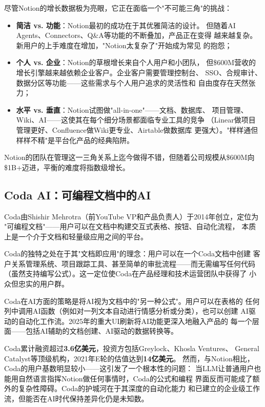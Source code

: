 \begin{warnbox}
尽管Notion的增长数据极为亮眼，它正在面临一个"不可能三角"的挑战：
\begin{itemize}
  \item \textbf{简洁 vs. 功能}：Notion最初的成功在于其优雅简洁的设计。
    但随着AI Agents、Connectors、Q\&A等功能的不断叠加，产品正在变得
    越来越复杂。新用户的上手难度在增加，"Notion太复杂了"开始成为常见
    的抱怨；
  \item \textbf{个人 vs. 企业}：Notion的草根增长来自个人用户和小团队，
    但\$600M营收的增长引擎越来越依赖企业客户。企业客户需要管理控制台、
    SSO、合规审计、数据分区等功能——这些需求与个人用户追求的灵活性和
    自由度存在天然张力；
  \item \textbf{水平 vs. 垂直}：Notion试图做"all-in-one"——文档、数据库、
    项目管理、Wiki、AI——这使其在每个细分场景都面临专业工具的竞争
    （Linear做项目管理更好、Confluence做Wiki更专业、Airtable做数据库
    更强大）。"样样通但样样不精"是平台化产品的经典陷阱。
\end{itemize}
Notion的团队在管理这一三角关系上迄今做得不错，但随着公司规模从\$600M向
\$1B+迈进，平衡的难度将指数级增长。
\end{warnbox}

\subsection{Coda AI：可编程文档中的AI}
\label{subsec:coda-ai}

Coda由Shishir Mehrotra（前YouTube VP和产品负责人）于2014年创立，定位为
"可编程文档"——用户可以在文档中构建交互式表格、按钮、自动化流程，
本质上是一个介于文档和轻量级应用之间的平台。

Coda的独特之处在于其"文档即应用"的理念：用户可以在一个Coda文档中创建
客户关系管理系统、项目跟踪工具、甚至简单的审批流程——而无需编写任何代码
（虽然支持编写公式）。这一定位使Coda在产品经理和技术运营团队中获得了
小众但忠实的用户群。

Coda在AI方面的策略是将AI视为文档中的"另一种公式"。用户可以在表格的
任何列中调用AI函数（例如对一列文本自动进行情感分析或分类），也可以创建
AI驱动的自动化工作流。2025年的重大UI刷新将AI功能更深入地融入产品的
每一个层面——包括AI辅助的文档创建、AI驱动的数据转换等。

Coda累计融资超过\textbf{3.6亿美元}，投资方包括Greylock、Khosla Ventures、
General Catalyst等顶级机构，2021年E轮的估值达到\textbf{14亿美元}。
然而，与Notion相比，Coda的用户基数明显较小——这引发了一个根本性的问题：
当LLM让普通用户也能用自然语言指挥Notion做任何事情时，Coda的公式和编程
界面反而可能成了额外的复杂性障碍。Coda的护城河在于其深度的自动化能力
和已建立的企业级工作流，但能否在AI时代保持差异化仍是未知数。

